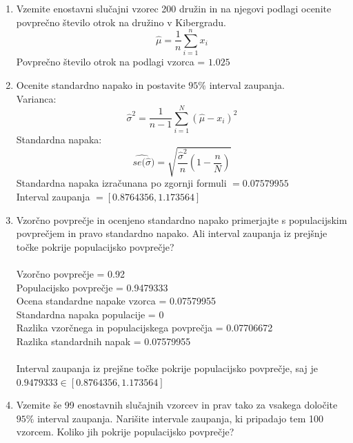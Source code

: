 \documentclass[a4paper]{article}
\begin{document}
\begin{enumerate}[label=(\alph*)]

\item Vzemite enostavni slučajni vzorec 200 družin in na njegovi podlagi ocenite povprečno število otrok na družino v Kibergradu. 
\begin{equation*}
\hat{\mu} = \frac{1}{n} \sum_{i=1}^{n} x_{i}
\end{equation*}
Povprečno število otrok na podlagi vzorca  = $1.025$

\item Ocenite standardno napako in postavite $95\%$ interval zaupanja. \\
Varianca:
\begin{equation*}
\hat{\sigma}^2 = \frac{1}{n-1} \sum_{i=1}^{N}(\hat{\mu}-x_{i})^2
\end{equation*}
Standardna napaka:
\begin{equation*}
\widehat{ se(\hat{\sigma}}) = \sqrt{\frac{\hat{\sigma}^2}{n} \left(1-\frac{n}{N}\right) }
\end{equation*}
Standardna napaka izračunana po zgornji formuli $ = 0.07579955$ \\
Interval zaupanja $= [0.8764356, 1.173564]$

\item Vzorčno povprečje in ocenjeno standardno napako primerjajte s populacijskim povprečjem in pravo standardno napako. Ali interval zaupanja iz prejšnje točke pokrije populacijsko povprečje? \\ \\
Vzorčno povprečje = 0.92 \\
Populacijsko povprečje =  0.9479333 \\
Ocena standardne napake vzorca =  0.07579955 \\
Standardna napaka populacije =  0 \\
Razlika vzorčnega in populacijskega povprečja = 0.07706672 \\
Razlika standardnih napak = 0.07579955 \\ \\
Interval zaupanja iz prejšne točke pokrije populacijsko povprečje, saj je $0.9479333 \in [0.8764356, 1.173564]$

\item Vzemite še 99 enostavnih slučajnih vzorcev in prav tako za vsakega določite $95\%$ interval zaupanja. Narišite intervale zaupanja, ki pripadajo tem 100 vzorcem. Koliko jih pokrije populacijsko povprečje? \\ \


\end{enumerate}
\end{document}
